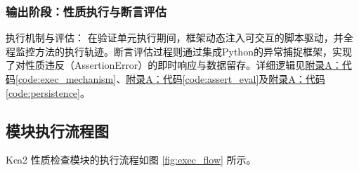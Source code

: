 \documentclass[a4paper, zihao=-4]{ctexart}
\newcommand{\bff}[1]{{\heiti #1}}
\begin{document}
\subsubsection{输出阶段：性质执行与断言评估}

\bff{执行机制与评估}：
在验证单元执行期间，框架动态注入可交互的脚本驱动，并全程监控方法的执行轨迹。断言评估过程则通过集成Python的异常捕捉框架，实现了对性质违反（AssertionError）的即时响应与数据留存。详细逻辑见\hyperref[code:exec_mechanism]{附录A：代码\ref{code:exec_mechanism}}、\hyperref[code:assert_eval]{附录A：代码\ref{code:assert_eval}}及\hyperref[code:persistence]{附录A：代码\ref{code:persistence}}。

\subsection{模块执行流程图}

Kea2 性质检查模块的执行流程如图 \ref{fig:exec_flow} 所示。
\end{document}
